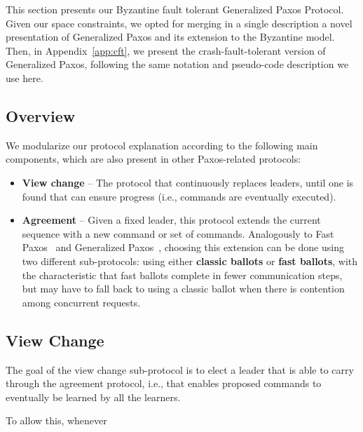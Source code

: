 This section presents our Byzantine fault tolerant Generalized Paxos
Protocol. Given our space constraints, we opted for merging in a
single description a novel presentation of Generalized Paxos and its
extension to the Byzantine model. Then, in Appendix~\ref{app:cft}, we
present the crash-fault-tolerant version of Generalized Paxos,
following the same notation and pseudo-code description we use here.

\subsection{Overview}

We modularize our protocol explanation according to the following main components, which are also present in other Paxos-related protocols:

\begin{itemize}

\item
{\bf View change} -- The protocol that continuously replaces leaders, until one is found that can ensure progress (i.e., commands are eventually executed).

\item
{\bf Agreement} -- Given a fixed leader, this protocol extends the current sequence with a new command or set of commands. Analogously to Fast Paxos~\cite{fast:paxos} and Generalized Paxos~\cite{generalized:paxos}, choosing this extension can be done using two different sub-protocols: using either {\bf classic ballots} or {\bf fast ballots}, with the characteristic that fast ballots complete in fewer communication steps, but may have to fall back to using a classic ballot when there is contention among concurrent requests.

\end{itemize}

\subsection{View Change} 

The goal of the view change sub-protocol is to elect a leader that is able to carry through the agreement protocol, i.e., that enables proposed commands to eventually be learned by all the learners.

To allow this, whenever 

